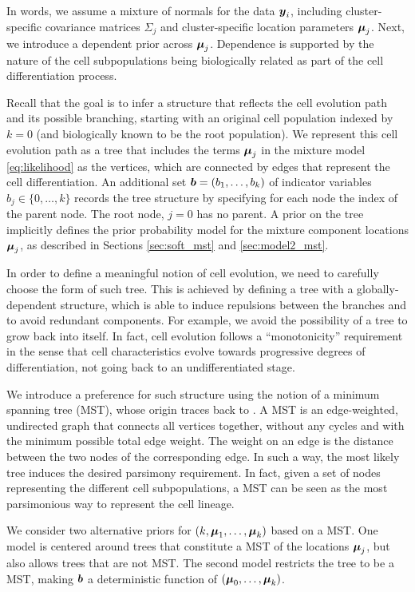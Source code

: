 In words, we assume a mixture of normals for the data $\mbox{\boldmath $y$}_i$, including cluster-specific covariance matrices $\Sigma_j$ and cluster-specific location parameters $\mbox{\boldmath $\mu$}_j$.
Next, we introduce a dependent prior across $\mbox{\boldmath $\mu$}_j$.
Dependence is supported by the nature of the cell subpopulations being biologically related as part of the cell differentiation process.


 Recall that the goal is  to infer a structure that reflects the cell evolution path and its possible branching,  starting with an original cell population indexed by $k=0$ (and biologically known to be the root population).
 We represent this cell evolution path as a tree that includes the terms $\mbox{\boldmath $\mu$}_j$ in the mixture model \eqref{eq:likelihood} as the vertices, which are connected by edges that represent the cell differentiation.
An additional set $\mbox{\boldmath $b$}=(b_1, \ldots, b_k)$ of indicator variables $b_j \in \{0,\ldots,k\}$ records the tree structure by specifying for each node the index of the parent node. The root node, $j=0$ has no parent.
A prior on the tree implicitly defines the prior probability model for the mixture component locations $\mbox{\boldmath $\mu$}_j$, as described in Sections \ref{sec:soft_mst} and \ref{sec:model2_mst}. 

In order to define a meaningful notion of cell evolution, we need to carefully choose the form of such tree.
This is achieved by defining a tree with a globally-dependent structure, which is able to induce repulsions between the branches and to avoid redundant components. 
For example, we avoid the possibility of a tree to grow back into itself. 
In fact, cell evolution follows a ``monotonicity'' requirement in the sense that cell characteristics evolve towards progressive degrees of differentiation, not going back to an undifferentiated stage.

 We introduce a preference for such structure using the notion of a minimum spanning tree (MST), whose origin traces back to \cite{boruuvka1926contribution}.
A MST is an edge-weighted, undirected graph that connects all vertices together, without any cycles and with the minimum possible total edge weight.  
The weight on an edge is  the distance between the two nodes of the corresponding edge. 
In such a way, the most likely tree induces the desired parsimony requirement. 
In fact, given a set of nodes representing the different cell subpopulations, a MST can be seen as the most parsimonious way to represent the cell lineage.


We consider two alternative priors for $(k,\mbox{\boldmath $\mu$}_1,\ldots,\mbox{\boldmath $\mu$}_k)$ based on a MST.
One model is centered around trees that constitute a MST of the locations $\mbox{\boldmath $\mu$}_j$, but also allows trees that are not MST. 
The second model restricts the tree to be a MST, making $\mbox{\boldmath $b$}$ a deterministic function of $(\mbox{\boldmath $\mu$}_0,\ldots,\mbox{\boldmath $\mu$}_k)$.


